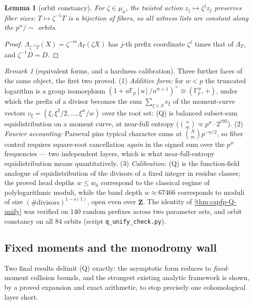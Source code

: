 \documentclass[11pt]{article}
\newtheorem{lemma}[lemma]{Lemma}
\theoremstyle{definition}
\theoremstyle{remark}
\newtheorem{remark}[remark]{Remark}
\newcommand{\F}{\mathbb{F}}
\begin{document}
\begin{lemma}[orbit constancy]\label{lem:capfp-orbit}
For $\zeta\in\mu_n$, the twisted action $z_j\mapsto\zeta^jz_j$ preserves fiber sizes: $T\mapsto\zeta^{-1}T$ is a bijection of fibers, so all witness lists are constant along the $p^w/\!\sim$ orbits.
\end{lemma}

\begin{proof}
$\Lambda_{\zeta^{-1}T}(X)=\zeta^{-m}\Lambda_T(\zeta X)$ has $j$-th prefix coordinate $\zeta^{j}$ times that of $\Lambda_T$, and $\zeta^{-1}D=D$.
\end{proof}

\begin{remark}[equivalent forms, and a hardness calibration]\label{rem:capfp-Q-forms}
Three further faces of the same object, the first two proved.  \textup{(1)}  \emph{Additive form:} for $w<p$ the truncated logarithm is a group isomorphism $(1+u\F_p[u]/u^{w+1})^\times\cong(\F_p^w,+)$, under which the prefix of a divisor becomes the sum $\sum_{\xi\in S}v_\xi$ of the moment-curve vectors $v_\xi=(\xi,\xi^2/2,\ldots,\xi^w/w)$ over the root set: \textup{(Q)} is balanced subset-sum equidistribution on a moment curve, at near-full entropy \textup($\binom nm\approx p^w\cdot2^{192}$\textup).  \textup{(2)}  \emph{Fourier accounting:} Parseval pins typical character sums at $\binom Nm p^{-w/2}$, so fiber control requires square-root cancellation \emph{again} in the signed sum over the $p^w$ frequencies --- two independent layers, which is what near-full-entropy equidistribution means quantitatively.  \textup{(3)}  \emph{Calibration:} \textup{(Q)} is the function-field analogue of equidistribution of the divisors of a fixed integer in residue classes; the proved head depths $w\le w_0$ correspond to the classical regime of polylogarithmic moduli, while the band depth $w\approx67466$ corresponds to moduli of size $(\#\text{divisors})^{1-o(1)}$, open even over $\mathbf Z$.  The identity of \cref{thm:capfp-Q-unify} was verified on $140$ random prefixes across two parameter sets, and orbit constancy on all $84$ orbits \textup(script \texttt{q\_unify\_check.py}\textup).
\end{remark}

\subsection{Fixed moments and the monodromy wall}

Two final results delimit \textup{(Q)} exactly: the asymptotic form reduces to \emph{fixed}-moment collision bounds, and the strongest existing analytic framework is shown, by a proved expansion and exact arithmetic, to stop precisely one cohomological layer short.
\end{document}
